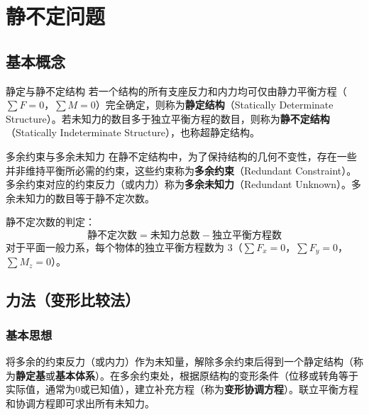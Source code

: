 \chapter{静不定问题}


\section{基本概念}

\begin{mydefinition}{静定与静不定结构}
    若一个结构的所有支座反力和内力均可仅由静力平衡方程（\(\sum F = 0\)，\(\sum M = 0\)）完全确定，则称为\textbf{静定结构}（Statically Determinate Structure）。若未知力的数目多于独立平衡方程的数目，则称为\textbf{静不定结构}（Statically Indeterminate Structure），也称超静定结构。
\end{mydefinition}

\begin{mydefinition}{多余约束与多余未知力}
    在静不定结构中，为了保持结构的几何不变性，存在一些并非维持平衡所必需的约束，这些约束称为\textbf{多余约束}（Redundant Constraint）。多余约束对应的约束反力（或内力）称为\textbf{多余未知力}（Redundant Unknown）。多余未知力的数目等于静不定次数。
\end{mydefinition}

静不定次数的判定：
\[
\text{静不定次数} = \text{未知力总数} - \text{独立平衡方程数}
\]
对于平面一般力系，每个物体的独立平衡方程数为 3（\(\sum F_x = 0\)，\(\sum F_y = 0\)，\(\sum M_z = 0\)）。

\section{力法（变形比较法）}

\subsection{基本思想}
将多余的约束反力（或内力）作为未知量，解除多余约束后得到一个静定结构（称为\textbf{静定基}或\textbf{基本体系}）。在多余约束处，根据原结构的变形条件（位移或转角等于实际值，通常为0或已知值），建立补充方程（称为\textbf{变形协调方程}）。联立平衡方程和协调方程即可求出所有未知力。


